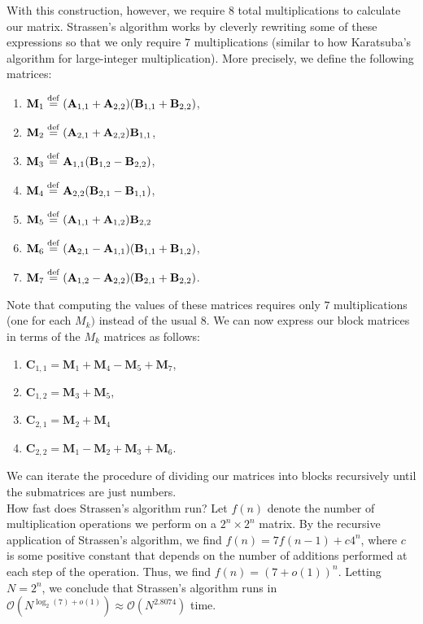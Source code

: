 With this construction, however, we require $8$ total multiplications to calculate our matrix. Strassen's algorithm works by cleverly rewriting some of these expressions so that we only require $7$ multiplications (similar to how Karatsuba's algorithm for large-integer multiplication). More precisely, we define the following matrices:

\begin{enumerate}
    \item $\mathbf{M}_{1} \overset{\mathrm{def}}{=} (\mathbf{A}_{1,1} + \mathbf{A}_{2,2})(\mathbf{B}_{1,1} + \mathbf{B}_{2,2})$,
    \item $\mathbf{M}_{2} \overset{\mathrm{def}}{=} (\mathbf{A}_{2,1} + \mathbf{A}_{2,2})\mathbf{B}_{1,1}$, 
    \item $\mathbf{M}_{3} \overset{\mathrm{def}}{=} \mathbf{A}_{1,1}(\mathbf{B}_{1,2} - \mathbf{B}_{2,2})$,
    \item $\mathbf{M}_{4} \overset{\mathrm{def}}{=} \mathbf{A}_{2,2}(\mathbf{B}_{2,1} - \mathbf{B}_{1,1})$,
    \item $\mathbf{M}_{5} \overset{\mathrm{def}}{=} (\mathbf{A}_{1,1} + \mathbf{A}_{1,2})\mathbf{B}_{2,2}$
    \item $\mathbf{M}_{6} \overset{\mathrm{def}}{=} (\mathbf{A}_{2,1} - \mathbf{A}_{1,1})(\mathbf{B}_{1,1} + \mathbf{B}_{1,2})$,
    \item $\mathbf{M}_{7} \overset{\mathrm{def}}{=} (\mathbf{A}_{1,2} - \mathbf{A}_{2,2})(\mathbf{B}_{2,1} + \mathbf{B}_{2,2})$.
\end{enumerate}

Note that computing the values of these matrices requires only $7$ multiplications (one for each $M_{k})$ instead of the usual $8$. We can now express our block matrices in terms of the $M_{k}$ matrices as follows:

\begin{enumerate}
    \item $\mathbf{C}_{1,1} = \mathbf{M}_{1} + \mathbf{M}_{4} - \mathbf{M}_{5} + \mathbf{M}_{7}$,
    \item $\mathbf{C}_{1,2} = \mathbf{M}_{3} + \mathbf{M}_{5}$,
    \item $\mathbf{C}_{2,1} = \mathbf{M}_{2} + \mathbf{M}_{4}$
    \item $\mathbf{C}_{2,2} = \mathbf{M}_{1} - \mathbf{M}_{2} + \mathbf{M}_{3} + \mathbf{M}_{6}$.
\end{enumerate}


We can iterate the procedure of dividing our matrices into blocks recursively until the submatrices are just numbers. \\

How fast does Strassen's algorithm run? Let $f(n)$ denote the number of multiplication operations we perform on a $2^{n}\times 2^{n}$ matrix. By the recursive application of Strassen's algorithm, we find $f(n) = 7f(n - 1) + c4^{n}$, where $c$ is some positive constant that depends on the number of additions performed at each step of the operation. Thus, we find $f(n) = (7 + o(1))^{n}$. Letting $N = 2^{n}$, we conclude that Strassen's algorithm runs in $\mathcal{O}(N^{\log_{2}(7) + o(1)})  \approx \mathcal{O}(N^{2.8074})$ time. \\


